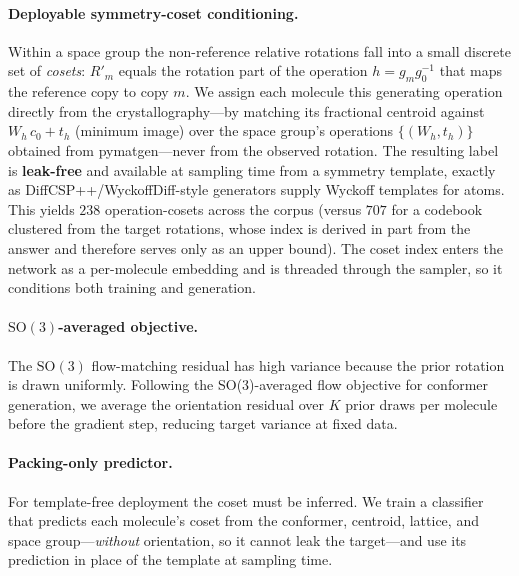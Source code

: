 \documentclass{article}
\begin{document}
\paragraph{Deployable symmetry-coset conditioning.}
\label{sec:coset}
Within a space group the non-reference relative rotations fall into a small
discrete set of \emph{cosets}: $R'_m$ equals the rotation part of the operation
$h=g_mg_0^{-1}$ that maps the reference copy to copy $m$. We assign each molecule
this generating operation directly from the crystallography---by matching its
fractional centroid against $W_h\,c_0+t_h$ (minimum image) over the space
group's operations $\{(W_h,t_h)\}$ obtained from pymatgen---never from the
observed rotation. The resulting label is \textbf{leak-free} and available at
sampling time from a symmetry template, exactly as DiffCSP++/WyckoffDiff-style
generators supply Wyckoff templates for atoms\cite{jiao2024diffcsppp,wyckoffdiff2025}.
This yields $238$ operation-cosets across the corpus (versus $707$ for a codebook
clustered from the target rotations, whose index is derived in part from the
answer and therefore serves only as an upper bound). The coset index enters the
network as a per-molecule embedding and is threaded through the sampler, so it
conditions both training and generation.

\paragraph{$\mathrm{SO}(3)$-averaged objective.}
The $\mathrm{SO}(3)$ flow-matching residual has high variance because the prior
rotation is drawn uniformly. Following the SO(3)-averaged flow objective for
conformer generation\cite{cao2025so3averaged}, we average the orientation
residual over $K$ prior draws per molecule before the gradient step, reducing
target variance at fixed data.

\paragraph{Packing-only predictor.}
For template-free deployment the coset must be inferred. We train a classifier
that predicts each molecule's coset from the conformer, centroid, lattice, and
space group---\emph{without} orientation, so it cannot leak the target---and use
its prediction in place of the template at sampling time.
\end{document}
